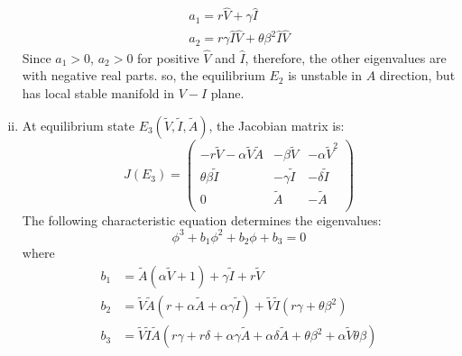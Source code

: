 \documentclass[12pt]{article}
\numberwithin{equation}{section}
\begin{document}
\begin{enumerate}[i).]
\begin{align}
a_1=r\hat V+\gamma \hat I\\
a_2=r\gamma \hat I \hat V+\theta \beta^2 \hat I \hat V
\end{align}
Since $a_1>0$, $a_2>0$ for positive $\hat V$ and $\hat I$, therefore, the other eigenvalues are with negative real parts. so, the equilibrium $E_2$ is unstable in $A$ direction, but has local stable manifold in $V-I$ plane.
\item At equilibrium state $E_3(\tilde V, \tilde I, \tilde A)$, the Jacobian matrix is:
\begin{equation}\label{sec3:e33}
J(E_3)=
\left({\begin{matrix}
	-r\tilde V-\alpha \tilde V \tilde A  & -\beta \tilde V & -\alpha \tilde V^2\\
	\theta \beta \tilde I & -\gamma \tilde I & -\delta \tilde I\\
	0 & \tilde A & -\tilde A\\
\end{matrix}}\right)
\end{equation}
The following characteristic equation determines the eigenvalues:
\begin{equation}\label{sec3:e34}
\phi^3+b_1\phi^2+b_2\phi+b_3=0
\end{equation}
where\\
\begin{align}\label{sec3:e34}
b_1&= \tilde A (\alpha \tilde V + 1) + \gamma \tilde I + r\tilde V\\
b_2&= \tilde V \tilde A (r + \alpha \tilde A + \alpha \gamma \tilde I) + \tilde V \tilde I(r\gamma + \theta \beta^2)\\
b_3 &=\tilde V \tilde I \tilde A (r\gamma + r\delta + \alpha \gamma \tilde A + \alpha \delta \tilde A + \theta \beta^2 + \alpha \tilde V \theta \beta)
\end{align}

\end{enumerate}
\end{document}
